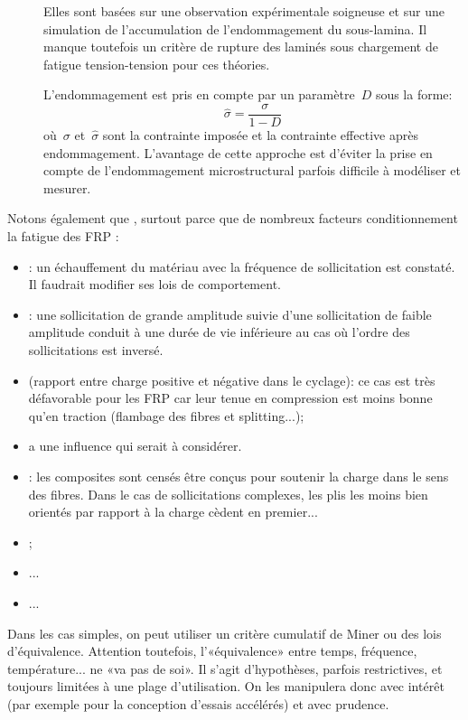 \begin{description}
  \item[] Elles sont basées
     sur une observation expérimentale soigneuse et sur une
     simulation de l'accumulation de l'endommagement du
     sous-lamina.
     Il manque toutefois un critère de rupture des laminés sous
     chargement de fatigue tension-tension pour ces théories.
  \item[] L'endommagement
     est pris en compte par un paramètre~$D$ sous la forme:
     \begin{equation}
      \widehat{\sigma}=\dfrac{\sigma}{1-D}
     \end{equation}
     où~$\sigma$ et~$\widehat{\sigma}$ sont la contrainte
     imposée et la contrainte effective après endommagement.
     L'avantage de cette approche est d'éviter la prise en
     compte de l'endommagement microstructural parfois difficile
     à modéliser et mesurer.
\end{description}
\medskipvm
Notons également que , surtout parce que de nombreux facteurs conditionnement la fatigue des FRP :
\begin{itemize}
	\item {}: un échauffement du matériau avec la fréquence de sollicitation est constaté. Il faudrait modifier ses lois de comportement.
	\item {}: une sollicitation de grande amplitude suivie d'une sollicitation de faible amplitude conduit à une durée de vie inférieure au cas où l'ordre des sollicitations est inversé.
	\item {} (rapport entre charge positive et négative dans le cyclage): ce cas est très défavorable pour les FRP car leur tenue en compression est moins bonne qu'en traction (flambage des fibres et splitting...);
	\item {} a une influence qui serait à considérer.
	\item {}: les composites sont censés être conçus pour soutenir la charge dans le sens des fibres. Dans le cas de sollicitations complexes, les plis les moins bien orientés par rapport à la charge cèdent en premier...
	\item {};
	\item {}...
	\item ...
\end{itemize}
\medskipvm
Dans les cas simples, on peut utiliser un critère cumulatif de Miner ou des lois d'équivalence. Attention toutefois, l'«équivalence» entre temps, fréquence, température... ne «va pas de soi». Il s'agit d'hypothèses, parfois restrictives, et toujours limitées à une plage d'utilisation. On les manipulera donc avec intérêt (par exemple pour la conception d'essais accélérés) et avec prudence.


